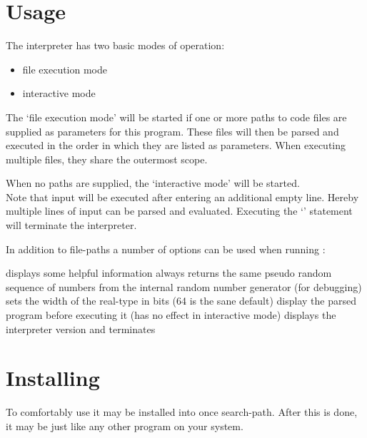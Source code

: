 \section{Usage}

The \setlX{} interpreter has two basic modes of operation:
\begin{itemize}
	\item file execution mode
	\item interactive mode
\end{itemize}

The `file execution mode' will be started if one or more paths to code files are supplied as parameters for this program. These files will then be parsed and executed in the order in which they are listed as parameters. When executing multiple files, they share the outermost scope.

When no paths are supplied, the `interactive mode' will be started.\\
Note that input will be executed after entering an additional empty line. Hereby multiple lines of input can be parsed and evaluated. Executing the `' statement will terminate the interpreter.


In addition to file-paths a number of options can be used when running \setlX{}:

\begin{itemize}
	      {displays some helpful information}
	      {always returns the same pseudo random sequence of numbers from the internal random number generator (for debugging)}
           {sets the width of the real-type in bits (64 is the sane default)}
           {display the parsed program before executing it (has no effect in interactive mode)}
           {displays the interpreter version and terminates}
\end{itemize}

\section{Installing}

To comfortably use \setlX{} it may be installed into once search-path. After this is done, it may be just like any other program on your system.

